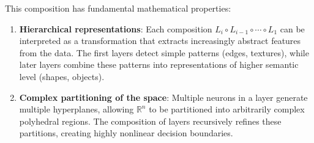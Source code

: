 This composition has fundamental mathematical properties:
\begin{enumerate}
    \item \textbf{Hierarchical representations}: Each composition $L_i \circ L_{i-1} \circ \cdots \circ L_1$ can be interpreted as a transformation that extracts increasingly abstract features from the data. The first layers detect simple patterns (edges, textures), while later layers combine these patterns into representations of higher semantic level (shapes, objects).

    \item \textbf{Complex partitioning of the space}: Multiple neurons in a layer generate multiple hyperplanes, allowing $\mathbb{R}^n$ to be partitioned into arbitrarily complex polyhedral regions. The composition of layers recursively refines these partitions, creating highly nonlinear decision boundaries.
\end{enumerate}

